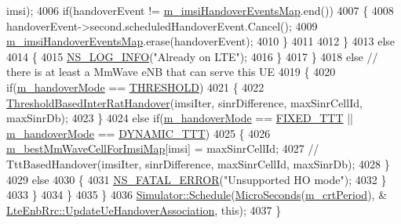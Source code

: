 \begin{DoxyCode}
      imsi); 
4006           \textcolor{keywordflow}{if}(handoverEvent != \hyperlink{classns3_1_1LteEnbRrc_a6f703158e9a4ceaccbd1c5df7f5b0ba1}{m\_imsiHandoverEventsMap}.end())
4007           \{
4008             handoverEvent->second.scheduledHandoverEvent.Cancel();
4009             \hyperlink{classns3_1_1LteEnbRrc_a6f703158e9a4ceaccbd1c5df7f5b0ba1}{m\_imsiHandoverEventsMap}.erase(handoverEvent);
4010           \}
4011           
4012         \}
4013         \textcolor{keywordflow}{else}
4014         \{
4015           \hyperlink{group__logging_gafbd73ee2cf9f26b319f49086d8e860fb}{NS\_LOG\_INFO}(\textcolor{stringliteral}{"Already on LTE"});
4016         \}
4017       \}
4018       \textcolor{keywordflow}{else} \textcolor{comment}{// there is at least a MmWave eNB that can serve this UE}
4019       \{
4020         \textcolor{keywordflow}{if}(\hyperlink{classns3_1_1LteEnbRrc_aa68424e6be8a396baf7fbad34e4dde06}{m\_handoverMode} == \hyperlink{classns3_1_1LteEnbRrc_a92c80910218354db2ad7ac531f896c94adf9f2c22d2fbf5ed241d6dcf5ecccd3a}{THRESHOLD})
4021         \{
4022           \hyperlink{classns3_1_1LteEnbRrc_aee1650bb9ecb5fca53f1d1f279338345}{ThresholdBasedInterRatHandover}(imsiIter, sinrDifference, 
      maxSinrCellId, maxSinrDb);  
4023         \}
4024         \textcolor{keywordflow}{else} \textcolor{keywordflow}{if}(\hyperlink{classns3_1_1LteEnbRrc_aa68424e6be8a396baf7fbad34e4dde06}{m\_handoverMode} == \hyperlink{classns3_1_1LteEnbRrc_a92c80910218354db2ad7ac531f896c94a6981655eb0cd4438cb9d5903d9b04e1a}{FIXED\_TTT} || 
      \hyperlink{classns3_1_1LteEnbRrc_aa68424e6be8a396baf7fbad34e4dde06}{m\_handoverMode} == \hyperlink{classns3_1_1LteEnbRrc_a92c80910218354db2ad7ac531f896c94a8cdb66e30f4eab71f699079471fbf40f}{DYNAMIC\_TTT})
4025         \{
4026           \hyperlink{classns3_1_1LteEnbRrc_a38d5bf3d53b16596824f07d4b4a1eab7}{m\_bestMmWaveCellForImsiMap}[imsi] = maxSinrCellId;
4027         \textcolor{comment}{//  TttBasedHandover(imsiIter, sinrDifference, maxSinrCellId, maxSinrDb);}
4028         \}
4029         \textcolor{keywordflow}{else}
4030         \{
4031           \hyperlink{group__fatal_ga5131d5e3f75d7d4cbfd706ac456fdc85}{NS\_FATAL\_ERROR}(\textcolor{stringliteral}{"Unsupported HO mode"});
4032         \}
4033       \}
4034     \}
4035   \}
4036   \hyperlink{classns3_1_1Simulator_a671882c894a08af4a5e91181bf1eec13}{Simulator::Schedule}(\hyperlink{group__timecivil_ga17465a639c8d1464e76538afdd78a9f0}{MicroSeconds}(\hyperlink{classns3_1_1LteEnbRrc_aace4582efc05d4990eaf4204aee468b7}{m\_crtPeriod}), &
      \hyperlink{classns3_1_1LteEnbRrc_a132982c39284f927b10b261b17b82a7a}{LteEnbRrc::UpdateUeHandoverAssociation}, \textcolor{keyword}{this});
4037 \}
\end{DoxyCode}


